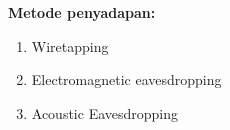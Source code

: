 \documentclass{article}
\begin{document}

\textbf{Metode penyadapan:}
\begin{enumerate}
  \item Wiretapping
  \item Electromagnetic eavesdropping
  \item Acoustic Eavesdropping
\end{enumerate}
\end{document}
